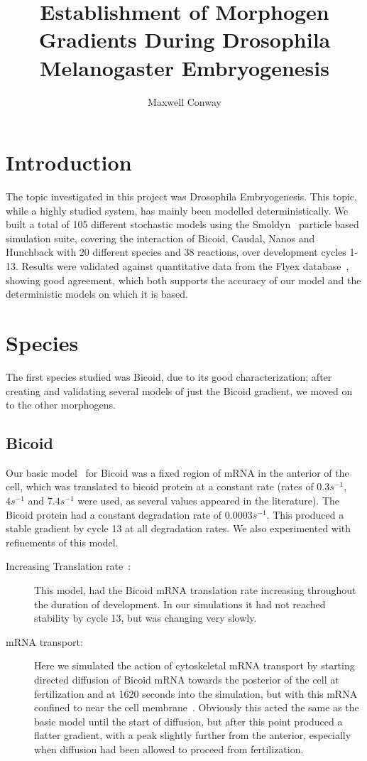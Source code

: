 \documentclass[11pt,a4paper,twocolumn]{article}
\begin{document}
\title{Establishment of Morphogen Gradients During Drosophila Melanogaster Embryogenesis}
\author{Maxwell Conway}
\date{}
\maketitle
\section{Introduction}
The topic investigated in this project was Drosophila Embryogenesis. This topic, while a highly studied system, has mainly been modelled deterministically. We built a total of 105 different stochastic models using the Smoldyn~\cite{Andrews2010} particle based simulation suite, covering the interaction of Bicoid, Caudal, Nanos and Hunchback with 20 different species and 38 reactions, over development cycles 1-13. Results were validated against quantitative data from the Flyex database~\cite{Pisarev2009}, showing good agreement, which both supports the accuracy of our model and the deterministic models on which it is based. 

\section{Species}
The first species studied was Bicoid, due to its good characterization; after creating and validating several models of just the Bicoid gradient, we moved on to the other morphogens.
\subsection{Bicoid}
Our basic model~\cite{Grimm2010} for Bicoid was a fixed region of mRNA in the anterior of the cell, which was translated to bicoid protein at a constant rate (rates of \(0.3s^{-1}\), \(4s^{-1}\) and \(7.4s^{-1}\) were used, as several values appeared in the literature). The Bicoid protein had a constant degradation rate of \(0.0003s^{-1}\). This produced a stable gradient by cycle 13 at all degradation rates. We also experimented with refinements of this model.
\begin{description}
\item[Increasing Translation rate~\cite{Holloway2011}:]
This model, had the Bicoid mRNA translation rate increasing throughout the duration of development. In our simulations it had not reached stability by cycle 13, but was changing very slowly.
\item[mRNA transport:]
Here we simulated the action of cytoskeletal mRNA transport by starting directed diffusion of Bicoid mRNA towards the posterior of the cell at fertilization and at 1620 seconds into the simulation, but with this mRNA confined to near the cell membrane~\cite{Spirov2009}. Obviously this acted the same as the basic model until the start of diffusion, but after this point produced a flatter gradient, with a peak slightly further from the anterior, especially when diffusion had been allowed to proceed from fertilization.
\end{description}
\end{document}
